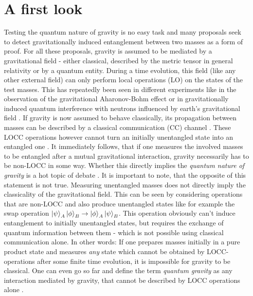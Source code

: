 \chapter{A first look}\label{cha:first-look}

Testing the quantum nature of gravity is no easy task and many proposals seek to detect gravitationally induced entanglement between two masses \cite{Marletto_2017,Krisnanda_2020,Chevalier_2020,Pedernales_2019,Bose_2017} as a form of proof. 
For all these proposals, gravity is assumed to be mediated by a gravitational field - either classical, described by the metric tensor in general relativity or by a quantum entity.
During a time evolution, this field (like any other external field) can only perform local operations (LO) on the states of the test masses.
This has repeatedly been seen in different experiments like in the observation of the gravitational Aharonov-Bohm effect \cite{Overstreet_2022} or in gravitationally induced quantum interference with neutrons influenced by earth's gravitational field \cite{Colella_1975}.
If gravity is now assumed to behave classically, its propagation between masses can be described by a classical communication (CC) channel \cite{Lami_2024}.
These LOCC operations however cannot turn an initially unentangled state into an entangled one \cite{Horodecki_2009, Plenio_2005a}.
It immediately follows, that if one measures the involved masses to be entangled after a mutual gravitational interaction, gravity necessarily has to be non-LOCC in some way.
Whether this directly implies the \textit{quantum nature of gravity} is a hot topic of debate \cite{Hall_2018}.
It is important to note, that the opposite of this statement is not true. Measuring unentangled masses does not directly imply the classicality of the gravitational field.
This can be seen by considering operations that are non-LOCC and also produce unentangled states like for example the swap operation $\ket{\psi}_A\ket{\phi}_B \rightarrow \ket{\phi}_A\ket{\psi}_B$. This operation obviously can't induce entanglement to initially unentangled states, but requires the exchange of quantum information between them - which is not possible using classical communication alone.
In other words: If one prepares masses initially in a pure product state and measures \textit{any} state which cannot be obtained by LOCC-operations after some finite time evolution, it is impossible for gravity to be classical. One can even go so far and define the term \emph{quantum gravity} as any interaction mediated by gravity, that cannot be described by LOCC operations alone \cite{Lami_2024}.

